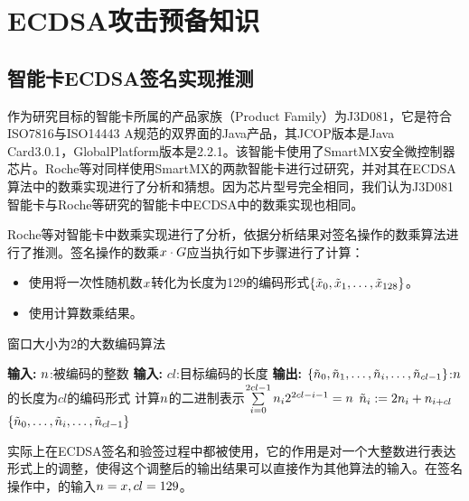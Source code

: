 {	\section{ECDSA攻击预备知识}\label{sec:vulnerable}
	\subsection{智能卡ECDSA签名实现推测}
	
	作为研究目标的智能卡所属的产品家族（Product Family）为J3D081，它是符合ISO7816\citep{ISO/IEC7816}与ISO14443 A\citep{ISO/IEC14443}规范的双界面的Java产品，其JCOP版本是Java Card3.0.1，GlobalPlatform版本是2.2.1。该智能卡使用了SmartMX\citep{p5x}安全微控制器芯片。Roche等\citep{Roche21}对同样使用SmartMX的两款智能卡进行过研究，并对其在ECDSA算法中的数乘实现进行了分析和猜想。因为芯片型号完全相同，我们认为J3D081智能卡与Roche等\citep{Roche21}研究的智能卡中ECDSA中的数乘实现也相同。
	
	Roche等\citep{Roche21}对智能卡中数乘实现进行了分析，依据分析结果对签名操作的数乘算法进行了推测。签名操作的数乘$x\cdot G$应当执行如下步骤进行了计算：
	
	\begin{itemize}
		\item 使用将一次性随机数$x$转化为长度为129的编码形式$\left\{\tilde{x}_0,\tilde{x}_1,\dots,\tilde{x}_{128}\right\}$。
		\item 使用计算数乘结果。
	\end{itemize}
	
	\begin{breakablealgorithm}
		\caption{窗口大小为2的大数编码算法}\label{alg:encodek}
		\begin{algorithmic}[1]
			\Statex \textbf{输入:} $n$:被编码的整数
			\Statex \textbf{输入:} $cl$:目标编码的长度
			\Statex \textbf{输出:} $\left\{\tilde{n}_0,\tilde{n}_1,\dots,\tilde{n}_i,\dots, \tilde{n}_{cl-1}\right\}$:$n$的长度为$cl$的编码形式
			\State 计算$n$的二进制表示$\sum\limits_{i=0}^{2cl-1}n_i2^{2cl-i-1}=n$
			\State $\tilde {n}_i:=2n_i+n_{i+cl}$
			\EndFor
			\State \Return $\left\{\tilde{n}_0,\dots,\tilde{n}_i,\dots, \tilde{n}_{cl-1}\right\}$
		\end{algorithmic}
	\end{breakablealgorithm}

	实际上在ECDSA签名和验签过程中都被使用，它的作用是对一个大整数进行表达形式上的调整，使得这个调整后的输出结果可以直接作为其他算法的输入。在签名操作中，的输入$n=x,cl=129$。

}

